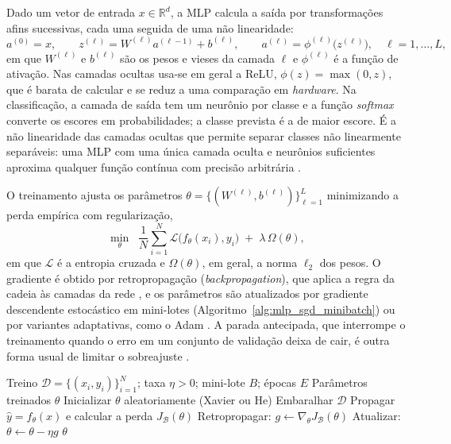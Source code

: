 Dado um vetor de entrada \(x \in \mathbb{R}^{d}\), a MLP calcula a saída por transformações afins sucessivas, cada uma seguida de uma não linearidade:
\begin{equation}
	a^{(0)} = x,\qquad
	z^{(\ell)} = W^{(\ell)} a^{(\ell-1)} + b^{(\ell)},\qquad
	a^{(\ell)} = \phi^{(\ell)}\!\big(z^{(\ell)}\big), \quad \ell = 1,\ldots,L,
	\label{eq:mlp_forward}
\end{equation}
em que \(W^{(\ell)}\) e \(b^{(\ell)}\) são os pesos e vieses da camada \(\ell\) e \(\phi^{(\ell)}\) é a função de ativação. Nas camadas ocultas usa-se em geral a ReLU, \(\phi(z)=\max(0,z)\), que é barata de calcular e se reduz a uma comparação em \textit{hardware}. Na classificação, a camada de saída tem um neurônio por classe e a função \textit{softmax} converte os escores em probabilidades; a classe prevista é a de maior escore. É a não linearidade das camadas ocultas que permite separar classes não linearmente separáveis: uma MLP com uma única camada oculta e neurônios suficientes aproxima qualquer função contínua com precisão arbitrária \cite{cybenko1989approximation,hornik1991approximation}.

O treinamento ajusta os parâmetros \(\theta=\{(W^{(\ell)},b^{(\ell)})\}_{\ell=1}^{L}\) minimizando a perda empírica com regularização,
\begin{equation}
	\min_{\theta}\;\; \frac{1}{N}\sum_{i=1}^{N}\mathcal{L}\big(f_{\theta}(x_i),y_i\big)\;+\;\lambda\,\Omega(\theta),
	\label{eq:mlp_perda}
\end{equation}
em que \(\mathcal{L}\) é a entropia cruzada e \(\Omega(\theta)\), em geral, a norma \(\ell_2\) dos pesos. O gradiente é obtido por retropropagação (\textit{backpropagation}), que aplica a regra da cadeia às camadas da rede \cite{rumelhart1986learning}, e os parâmetros são atualizados por gradiente descendente estocástico em mini-lotes (Algoritmo~\ref{alg:mlp_sgd_minibatch}) ou por variantes adaptativas, como o Adam \cite{kingma2015adam}. A parada antecipada, que interrompe o treinamento quando o erro em um conjunto de validação deixa de cair, é outra forma usual de limitar o sobreajuste \cite{prechelt1998}.

\begin{algorithm}[htbp]
	\caption{Treinamento de uma MLP por gradiente descendente estocástico em mini-lotes}
	\label{alg:mlp_sgd_minibatch}
	\begin{algorithmic}[1]
		\Require Treino \(\mathcal{D}=\{(x_i,y_i)\}_{i=1}^{N}\); taxa \(\eta>0\); mini-lote \(B\); épocas \(E\)
		\Ensure Parâmetros treinados \(\theta\)
		\State Inicializar \(\theta\) aleatoriamente (Xavier ou He)
		\State Embaralhar \(\mathcal{D}\)
		\State Propagar \(\hat{y}=f_{\theta}(x)\) e calcular a perda \(J_{\mathcal{B}}(\theta)\)
		\State Retropropagar: \(g \gets \nabla_{\theta} J_{\mathcal{B}}(\theta)\)
		\State Atualizar: \(\theta \gets \theta - \eta g\)
		\EndFor
		\EndFor
		\State \Return \(\theta\)
	\end{algorithmic}
\end{algorithm}

